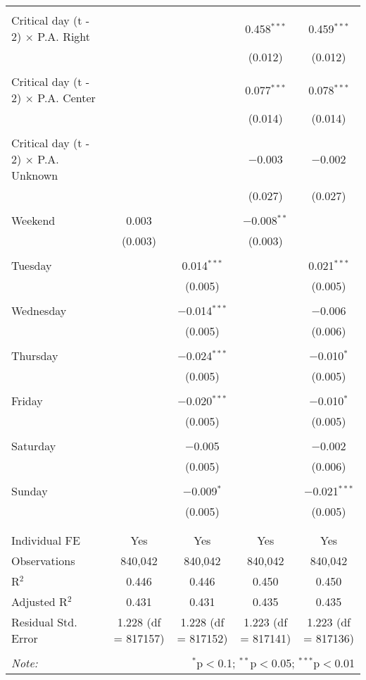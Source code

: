 \documentclass[
]{article}
\begin{document}
\begin{table}[!htbp]
{\begin{tabular}{@{\extracolsep{5pt}}lcccc}
  & & & & \\ 
 Critical day (t - 2) $\times$ P.A. Right &  &  & 0.458$^{***}$ & 0.459$^{***}$ \\ 
  &  &  & (0.012) & (0.012) \\ 
  & & & & \\ 
 Critical day (t - 2) $\times$ P.A. Center &  &  & 0.077$^{***}$ & 0.078$^{***}$ \\ 
  &  &  & (0.014) & (0.014) \\ 
  & & & & \\ 
 Critical day (t - 2) $\times$ P.A. Unknown &  &  & $-$0.003 & $-$0.002 \\ 
  &  &  & (0.027) & (0.027) \\ 
  & & & & \\ 
 Weekend & 0.003 &  & $-$0.008$^{**}$ &  \\ 
  & (0.003) &  & (0.003) &  \\ 
  & & & & \\ 
 Tuesday &  & 0.014$^{***}$ &  & 0.021$^{***}$ \\ 
  &  & (0.005) &  & (0.005) \\ 
  & & & & \\ 
 Wednesday &  & $-$0.014$^{***}$ &  & $-$0.006 \\ 
  &  & (0.005) &  & (0.006) \\ 
  & & & & \\ 
 Thursday &  & $-$0.024$^{***}$ &  & $-$0.010$^{*}$ \\ 
  &  & (0.005) &  & (0.005) \\ 
  & & & & \\ 
 Friday &  & $-$0.020$^{***}$ &  & $-$0.010$^{*}$ \\ 
  &  & (0.005) &  & (0.005) \\ 
  & & & & \\ 
 Saturday &  & $-$0.005 &  & $-$0.002 \\ 
  &  & (0.005) &  & (0.006) \\ 
  & & & & \\ 
 Sunday &  & $-$0.009$^{*}$ &  & $-$0.021$^{***}$ \\ 
  &  & (0.005) &  & (0.005) \\ 
  & & & & \\ 
\hline \\[-1.8ex] 
Individual FE & Yes & Yes & Yes & Yes \\ 
Observations & 840,042 & 840,042 & 840,042 & 840,042 \\ 
R$^{2}$ & 0.446 & 0.446 & 0.450 & 0.450 \\ 
Adjusted R$^{2}$ & 0.431 & 0.431 & 0.435 & 0.435 \\ 
Residual Std. Error & 1.228 (df = 817157) & 1.228 (df = 817152) & 1.223 (df = 817141) & 1.223 (df = 817136) \\ 
\hline 
\hline \\[-1.8ex] 
\textit{Note:}  & \multicolumn{4}{r}{$^{*}$p$<$0.1; $^{**}$p$<$0.05; $^{***}$p$<$0.01} \\ 
\end{tabular}
} 
\end{table} 
\newpage
\end{document}
